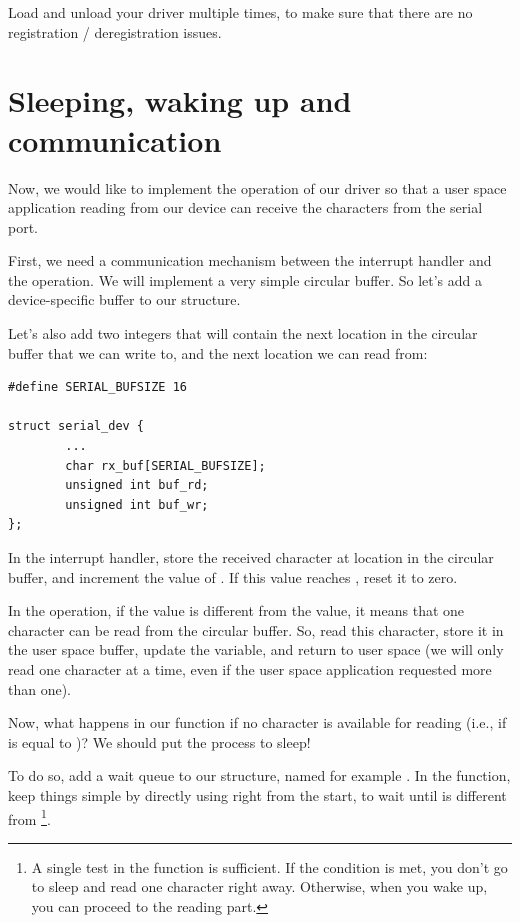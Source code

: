 {{{{Load and unload your driver multiple times, to make sure that
there are no registration / deregistration issues.

\section{Sleeping, waking up and communication}

Now, we would like to implement the  operation of our
driver so that a user space application reading from our device can
receive the characters from the serial port.

First, we need a communication mechanism between the interrupt handler
and the  operation. We will implement a very simple
circular buffer. So let's add a device-specific buffer to our
 structure.

Let's also add two integers that will contain the next location
in the circular buffer that we can write to, and the next location
we can read from:

\begin{verbatim}
#define SERIAL_BUFSIZE 16

struct serial_dev {
        ...
        char rx_buf[SERIAL_BUFSIZE];
        unsigned int buf_rd;
        unsigned int buf_wr;
};
\end{verbatim}

In the interrupt handler, store the received character at location
 in the circular buffer, and increment the value
of . If this value reaches ,
reset it to zero.

In the  operation, if the  value is
different from the  value, it means that one
character can be read from the circular buffer. So, read this
character, store it in the user space buffer, update the
 variable, and return to user space (we will only
read one character at a time, even if the user space application
requested more than one).

Now, what happens in our  function if no character is
available for reading (i.e., if  is equal to
)? We should put the process to sleep!

To do so, add a  wait queue to our
 structure, named for example . In the
 function, keep things simple by directly using
 right from the start, to wait until
 is different from \footnote{A single test in the
 function is sufficient. If the
condition is met, you don't go to sleep and read one character right away.
Otherwise, when you wake up, you can proceed to the reading part.}.

}}}}
